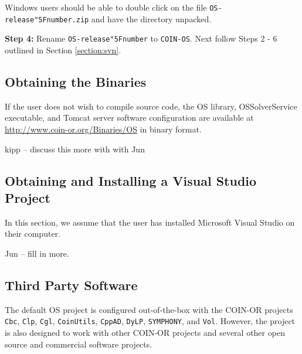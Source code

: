 \documentclass[11pt]{article}
\renewcommand{\_}{{\char"5F}}
\renewcommand{\{}{{\char"7B}}
\renewcommand{\}}{{\char"7D}}
\renewcommand{\^}{{\char"0D}}
\renewcommand{\'}{{\char"0D}}
\begin{document}
Windows users should be  able to double click on the file {\tt OS-release\_number.zip} and have the directory unpacked. 

\vskip 8pt

{\bf Step 4:} Rename {\tt OS-release\_number} to {\tt COIN-OS}.    Next follow Steps 2 - 6 outlined in Section \ref{section:svn}.

\subsection{Obtaining the Binaries}

If the user does not wish to compile source code, the 
OS library, OSSolverService executable, and Tomcat server software configuration are available at \url{http://www.coin-or.org/Binaries/OS} in binary format.


kipp -- discuss this more with with Jun


\subsection{Obtaining and Installing a Visual Studio Project}

In this section, we assume that the user has installed Microsoft Visual Studio on their computer. 

Jun -- fill in more. 




\subsection{Third Party Software}

The default OS project is configured out-of-the-box with the COIN-OR  projects {\tt Cbc}, {\tt Clp}, {\tt Cgl}, {\tt CoinUtils}, {\tt CppAD},  {\tt DyLP}, {\tt SYMPHONY}, and {\tt Vol}.  However, the project is also designed to work with other COIN-OR projects and several other open source and commercial software projects. 
\end{document}
